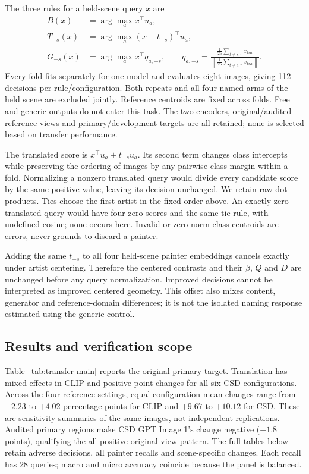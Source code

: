 The three rules for a held-scene query $x$ are
\begin{align}
 B(x)&=\arg\max_a x^\top u_a,\\
 T_{-s}(x)&=\arg\max_a (x+t_{-s})^\top u_a,\\
 G_{-s}(x)&=\arg\max_a x^\top q_{a,-s},\qquad
 q_{a,-s}=\frac{\frac1{26}\sum_{t\ne s,r}x_{tra}}
 {\left\|\frac1{26}\sum_{t\ne s,r}x_{tra}\right\|}.
\end{align}
Every fold fits separately for one model and evaluates eight images, giving
112 decisions per rule/configuration. Both repeats and all four named arms of
the held scene are excluded jointly. Reference centroids are fixed across
folds. Free and generic outputs do not enter this task. The two encoders,
original/audited reference views and primary/development targets are all
retained; none is selected based on transfer performance.

The translated score is $x^\top u_a+t_{-s}^\top u_a$. Its second term changes
class intercepts while preserving the ordering of images by any pairwise
class margin within a fold. Normalizing a nonzero translated query would
divide every candidate score by the same positive value, leaving its decision
unchanged. We retain raw dot products. Ties choose the first artist in the
fixed order above. An exactly zero translated query would have four zero
scores and the same tie rule, with undefined cosine; none occurs here. Invalid
or zero-norm class centroids are errors, never grounds to discard a painter.

Adding the same $t_{-s}$ to all four held-scene painter embeddings cancels
exactly under artist centering. Therefore the centered contrasts and their
$\beta$, $Q$ and $D$ are unchanged before any query normalization. Improved
decisions cannot be interpreted as improved centered geometry. This offset
also mixes content, generator and reference-domain differences; it is not
the isolated naming response estimated using the generic control.

\subsection{Results and verification scope}
Table~\ref{tab:transfer-main} reports the original primary target. Translation
has mixed effects in CLIP and positive point changes for all six CSD
configurations. Across the four reference settings, equal-configuration mean
changes range from $+2.23$ to $+4.02$ percentage points for CLIP and $+9.67$ to
$+10.12$ for CSD. These are sensitivity summaries of the same images, not
independent replications. Audited primary regions make CSD GPT Image 1's
change negative ($-1.8$ points), qualifying the all-positive original-view
pattern. The full tables below retain adverse decisions,
all painter recalls and scene-specific changes. Each recall has 28 queries;
macro and micro accuracy coincide because the panel is balanced.

